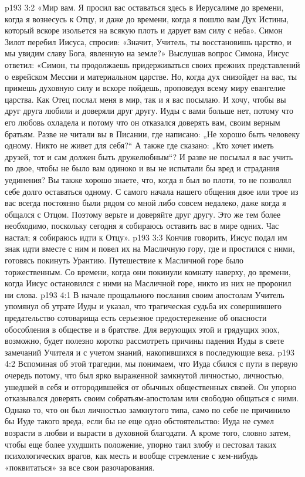 \vs p193 3:2 \pc «Мир вам. Я просил вас оставаться здесь в Иерусалиме до времени, когда я вознесусь к Отцу, и даже до времени, когда я пошлю вам Дух Истины, который вскоре изольется на всякую плоть и дарует вам силу с неба». Симон Зилот перебил Иисуса, спросив: «Значит, Учитель, ты восстановишь царство, и мы увидим славу Бога, явленную на земле?» Выслушав вопрос Симона, Иисус ответил: «Симон, ты продолжаешь придерживаться своих прежних представлений о еврейском Мессии и материальном царстве. Но, когда дух снизойдет на вас, ты примешь духовную силу и вскоре пойдешь, проповедуя всему миру евангелие царства. Как Отец послал меня в мир, так и я вас посылаю. И хочу, чтобы вы друг друга любили и доверяли друг другу. Иуды с вами больше нет, потому что его любовь охладела и потому что он отказался доверять вам, своим верным братьям. Разве не читали вы в Писании, где написано: „Не хорошо быть человеку одному. Никто не живет для себя?“ А также где сказано: „Кто хочет иметь друзей, тот и сам должен быть дружелюбным“? И разве не посылал я вас учить по двое, чтобы не было вам одиноко и вы не испытали бы вред и страдания уединения? Вы также хорошо знаете, что, когда я был во плоти, то не позволял себе долго оставаться одному. С самого начала нашего общения двое или трое из вас всегда постоянно были рядом со мной либо совсем недалеко, даже когда я общался с Отцом. Поэтому верьте и доверяйте друг другу. Это же тем более необходимо, поскольку сегодня я собираюсь оставить вас в мире одних. Час настал; я собираюсь идти к Отцу».
\vs p193 3:3 \pc Кончив говорить, Иисус подал им знак идти вместе с ним и повел их на Масличную гору, где и простился с ними, готовясь покинуть Урантию. Путешествие к Масличной горе было торжественным. Со времени, когда они покинули комнату наверху, до времени, когда Иисус остановился с ними на Масличной горе, никто из них не проронил ни слова.
\vs p193 4:1 В начале прощального послания своим апостолам Учитель упомянул об утрате Иуды и указал, что трагическая судьба их совершившего предательство сотоварища есть серьезное предостережение об опасности обособления в обществе и в братстве. Для верующих этой и грядущих эпох, возможно, будет полезно коротко рассмотреть причины падения Иуды в свете замечаний Учителя и с учетом знаний, накопившихся в последующие века.
\vs p193 4:2 Вспоминая об этой трагедии, мы понимаем, что Иуда сбился с пути в первую очередь потому, что был ярко выраженной замкнутой личностью, личностью, ушедшей в себя и отгородившейся от обычных общественных связей. Он упорно отказывался доверять своим собратьям\hyp{}апостолам или свободно общаться с ними. Однако то, что он был личностью замкнутого типа, само по себе не причинило бы Иуде такого вреда, если бы не еще одно обстоятельство: Иуда не сумел возрасти в любви и вырасти в духовной благодати. А кроме того, словно затем, чтобы еще более ухудшить положение, упорно таил злобу и пестовал таких психологических врагов, как месть и вообще стремление с кем\hyp{}нибудь «поквитаться» за все свои разочарования.
